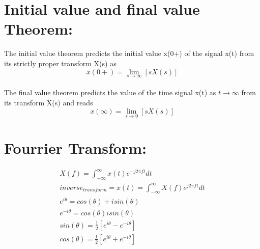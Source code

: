 \documentclass[13pt,a4paper]{article}
\begin{document}
\section{Initial value and final value Theorem:}
The initial value theorem predicts the initial value x(0+) of the signal x(t) from its strictly proper transform X(s) as \\
$$x(0+)=\lim_{s\to\infty} [sX(s)]$$\\
The final value theorem predicts the value of the time signal x(t) as $t\rightarrow \infty$ from its transform X(s) and reads\\
$$x(\infty)=\lim_{s\to0}[sX(s)]$$

\section{Fourrier Transform:}
\begin{gather*}
X(f)=\int^{\infty}_{-\infty}x(t)e^{-j2\pi ft}dt\\
inverse_{transform}=x(t)=\int^{\infty}_{-\infty}X(f)e^{j2\pi ft}dt\\
e^{i\theta}=cos(\theta)+isin(\theta)\\
e^{-i\theta}=cos(\theta)isin(\theta)\\
sin(\theta)=\frac{1}{2}[e^{i\theta}-e^{-i\theta}]\\
cos(\theta)=\frac{1}{2}[e^{i\theta}+e^{-i\theta}]
\end{gather*}
\end{document}

